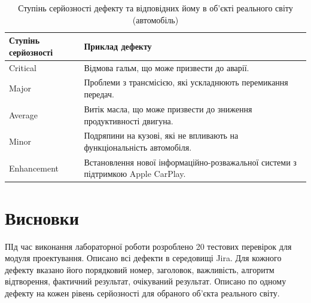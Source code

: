 \documentclass[oneside,14pt]{extarticle}
\begin{document}
\begin{normalsize}
	\begin{longtable}{|p{4cm}|p{10cm}|}
		\caption{Ступінь серйозності дефекту та відповідних йому в об’єкті реального світу (автомобіль)}
		\\\hline
		\textbf{Ступінь серйозності} & \textbf{Приклад дефекту} \\
		\hline
		Critical & Відмова гальм, що може призвести до аварії. \\
		\hline
		Major & Проблеми з трансмісією, які ускладнюють перемикання передач. \\
		\hline
		Average & Витік масла, що може призвести до зниження продуктивності двигуна. \\
		\hline
		Minor & Подряпини на кузові, які не впливають на функціональність автомобіля. \\
		\hline
		Enhancement & Встановлення нової інформаційно-розважальної системи з підтримкою Apple CarPlay. \\
		\hline
	\end{longtable}
	
	\section*{Висновки}
	ПІд час виконання лабораторної роботи розроблено 20 тестових перевірок для модуля проектування. Описано всі дефекти в середовищі Jira. Для кожного дефекту вказано його порядковий номер, заголовок, важливість, алгоритм відтворення, фактичний результат, очікуваний результат. Описано по одному дефекту на кожен рівень серйозності для обраного об'єкта реального світу.
	    
\end{normalsize}
\end{document}
